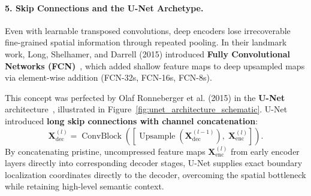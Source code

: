 \paragraph{5. Skip Connections and the U-Net Archetype.}
Even with learnable transposed convolutions, deep encoders lose irrecoverable fine-grained spatial information through repeated pooling. In their landmark work, Long, Shelhamer, and Darrell (2015) introduced \textbf{Fully Convolutional Networks (FCN)}~\cite{long2015fully}, which added shallow feature maps to deep upsampled maps via element-wise addition (FCN-32s, FCN-16s, FCN-8s).

This concept was perfected by Olaf Ronneberger et al. (2015) in the \textbf{U-Net} architecture~\cite{ronneberger2015u}, illustrated in Figure~\ref{fig:unet_architecture_schematic}. U-Net introduced \textbf{long skip connections with channel concatenation}:
\begin{equation}
\mathbf{X}_{\text{dec}}^{(l)} = \operatorname{ConvBlock}\left( \left[ \operatorname{Upsample}\left(\mathbf{X}_{\text{dec}}^{(l-1)}\right), \; \mathbf{X}_{\text{enc}}^{(l)} \right] \right).
\label{eq:unet_skip_concatenation}
\end{equation}
By concatenating pristine, uncompressed feature maps $\mathbf{X}_{\text{enc}}^{(l)}$ from early encoder layers directly into corresponding decoder stages, U-Net supplies exact boundary localization coordinates directly to the decoder, overcoming the spatial bottleneck while retaining high-level semantic context.

